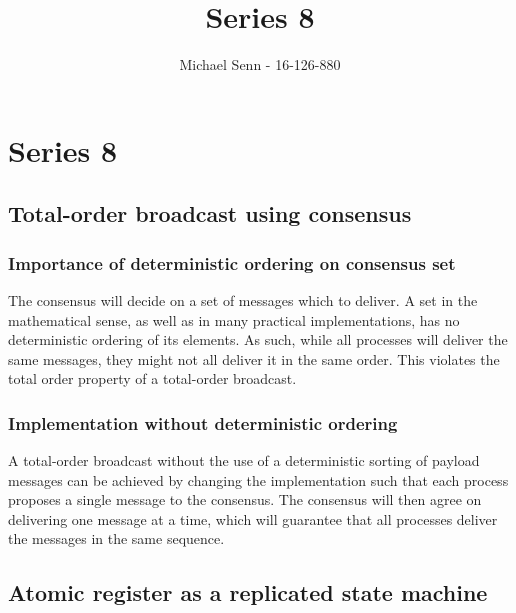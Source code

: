 \documentclass[a4paper]{scrreprt}
\title{Series 8}
\author{Michael Senn \maillink{michael.senn@students.unibe.ch} - 16-126-880}
\date{\printdate}
\begin{document}
\maketitle


\setcounter{chapter}{7}

\chapter{Series 8}

\section{Total-order broadcast using consensus}

\subsection{Importance of deterministic ordering on consensus set}

The consensus will decide on a set of messages which to deliver. A set in the
mathematical sense, as well as in many practical implementations, has no
deterministic ordering of its elements. As such, while all processes will
deliver the same messages, they might not all deliver it in the same order.
This violates the total order property of a total-order broadcast.

\subsection{Implementation without deterministic ordering}

A total-order broadcast without the use of a deterministic sorting of payload
messages can be achieved by changing the implementation such that each process
proposes a single message to the consensus. The consensus will then agree on
delivering one message at a time, which will guarantee that all processes
deliver the messages in the same sequence.

\section{Atomic register as a replicated state machine}
\end{document}
